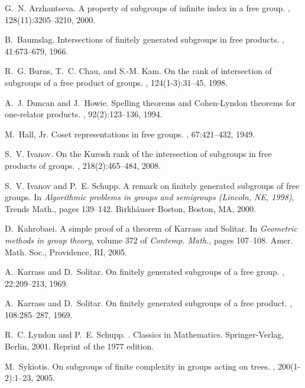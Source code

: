 \documentclass[11pt,reqno]{amsart}
\begin{document}
   
     
  
\begin{thebibliography}{10}

G.~N. Arzhantseva.
\newblock A property of subgroups of infinite index in a free group.
, 128(11):3205--3210, 2000.

B.~Baumslag.
\newblock Intersections of finitely generated subgroups in free products.
, 41:673--679, 1966.

R.~G. Burns, T.~C. Chau, and S.-M. Kam.
\newblock On the rank of intersection of subgroups of a free product of groups.
, 124(1-3):31--45, 1998.

A.~J. Duncan and J.~Howie.
\newblock Spelling theorems and {C}ohen-{L}yndon theorems for one-relator
  products.
, 92(2):123--136, 1994.

M.~Hall, Jr.
\newblock Coset representations in free groups.
, 67:421--432, 1949.

S.~V. Ivanov.
\newblock On the {K}urosh rank of the intersection of subgroups in free
  products of groups.
, 218(2):465--484, 2008.

S.~V. Ivanov and P.~E. Schupp.
\newblock A remark on finitely generated subgroups of free groups.
\newblock In {\em Algorithmic problems in groups and semigroups ({L}incoln,
  {NE}, 1998)}, Trends Math., pages 139--142. Birkh\"auser Boston, Boston, MA,
  2000.

D.~Kahrobaei.
\newblock A simple proof of a theorem of {K}arrass and {S}olitar.
\newblock In {\em Geometric methods in group theory}, volume 372 of {\em
  Contemp. Math.}, pages 107--108. Amer. Math. Soc., Providence, RI, 2005.

A.~Karrass and D.~Solitar.
\newblock On finitely generated subgroups of a free group.
, 22:209--213, 1969.

A.~Karrass and D.~Solitar.
\newblock On finitely generated subgroups of a free product.
, 108:285--287, 1969.

R.~C. Lyndon and P.~E. Schupp.
.
\newblock Classics in Mathematics. Springer-Verlag, Berlin, 2001.
\newblock Reprint of the 1977 edition.

M.~Sykiotis.
\newblock On subgroups of finite complexity in groups acting on trees.
, 200(1-2):1--23, 2005.

\end{thebibliography}
\end{document}
